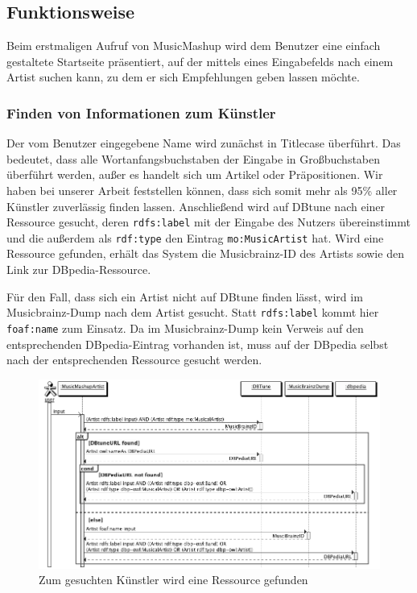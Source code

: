 \subsection{Funktionsweise}


Beim erstmaligen Aufruf von MusicMashup wird dem Benutzer eine einfach gestaltete Startseite präsentiert, auf der mittels eines Eingabefelds nach einem Artist  suchen kann, zu dem er sich Empfehlungen geben lassen möchte.



\subsubsection{Finden von Informationen zum Künstler}
Der vom Benutzer eingegebene Name wird zunächst in Titlecase überführt. Das bedeutet, dass alle Wortanfangsbuchstaben der Eingabe in Großbuchstaben überführt werden, außer es handelt sich um Artikel oder Präpositionen. Wir haben bei unserer Arbeit feststellen können, dass sich somit mehr als 95\% aller Künstler zuverlässig finden lassen.
Anschließend wird auf DBtune nach einer Ressource gesucht, deren \texttt{rdfs:label} mit der Eingabe des Nutzers übereinstimmt und die außerdem als \texttt{rdf:type} den Eintrag \texttt{mo:MusicArtist} hat. Wird eine Ressource gefunden, erhält das System die Musicbrainz-ID des Artists sowie den Link zur DBpedia-Ressource.

Für den Fall, dass sich ein Artist nicht auf DBtune finden lässt, wird im Musicbrainz-Dump nach dem Artist gesucht. Statt \texttt{rdfs:label} kommt hier \texttt{foaf:name} zum Einsatz. Da im Musicbrainz-Dump kein Verweis auf den entsprechenden DBpedia-Eintrag vorhanden ist, muss auf der DBpedia selbst nach der entsprechenden Ressource gesucht werden.

\begin{figure}[ht!]
\centering
\includegraphics[width=137mm]{bilder/sequenzdiagramm.png}
\caption{Zum gesuchten Künstler wird eine Ressource gefunden \label{overflow}}
\end{figure}


